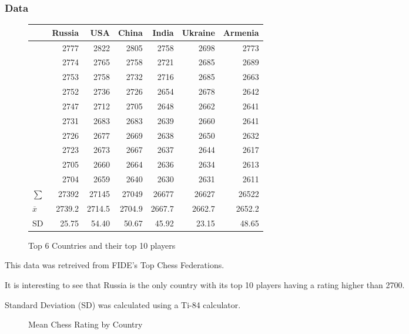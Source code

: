 \documentclass[12pt, titlepage]{article}
\begin{document}
\subsubsection{Data}
\begin{figure}[H]
  \centering
\begin{tabular}{lrrrrrr}
 & Russia & USA & China & India & Ukraine & Armenia\\
\hline
 & 2777 & 2822 & 2805 & 2758 & 2698 & 2773\\
 & 2774 & 2765 & 2758 & 2721 & 2685 & 2689\\
 & 2753 & 2758 & 2732 & 2716 & 2685 & 2663\\
 & 2752 & 2736 & 2726 & 2654 & 2678 & 2642\\
 & 2747 & 2712 & 2705 & 2648 & 2662 & 2641\\
 & 2731 & 2683 & 2683 & 2639 & 2660 & 2641\\
 & 2726 & 2677 & 2669 & 2638 & 2650 & 2632\\
 & 2723 & 2673 & 2667 & 2637 & 2644 & 2617\\
 & 2705 & 2660 & 2664 & 2636 & 2634 & 2613\\
 & 2704 & 2659 & 2640 & 2630 & 2631 & 2611\\
\(\sum\) & 27392 & 27145 & 27049 & 26677 & 26627 & 26522\\
 \(\overline{x}\) & 2739.2 & 2714.5 & 2704.9 & 2667.7 & 2662.7 & 2652.2\\
SD & 25.75 & 54.40 & 50.67 & 45.92 & 23.15 & 48.65\\
\end{tabular}
\caption{Top 6 Countries and their top 10 players}
\end{figure}
This data was retreived from FIDE's Top Chess Federations. 

It is interesting to see that Russia is the only country with its top 10 players having a rating higher than 2700.

Standard Deviation (SD) was calculated using a Ti-84 calculator.

\begin{figure}[H]
\centering
{}
\caption{Mean Chess Rating by Country}
\end{figure}
\end{document}

